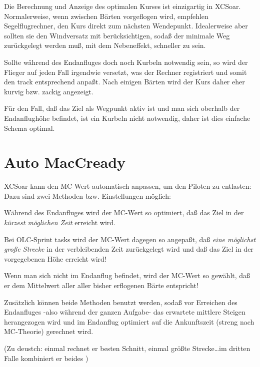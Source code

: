 Die Berechnung und Anzeige des optimalen Kurses ist einzigartig in \textsf{XCSoar}. Normalerweise,
wenn zwischen Bärten vorgeflogen wird, empfehlen Segelflugrechner, den Kurs direkt zum nächsten Wendepunkt.
Idealerweise aber sollten sie den Windversatz mit berücksichtigen, sodaß der minimale Weg zurückgelegt werden
muß, mit dem Nebeneffekt, schneller zu sein.

Sollte während des Endanfluges doch noch Kurbeln notwendig sein, so wird der Flieger auf jeden Fall
irgendwie versetzt, was der Rechner registriert und somit den track entsprechend anpaßt. Nach einigen
Bärten wird der Kurs daher eher kurvig bzw. zackig  angezeigt.

Für den Fall, daß das Ziel als Wegpunkt aktiv ist und man sich oberhalb der Endanflughöhe befindet, ist
ein Kurbeln nicht notwendig, daher ist dies einfache Schema optimal.

\section{Auto MacCready}\label{sec:auto-maccready}
\textsf{XCSoar} kann den MC-Wert automatisch anpassen, um den Piloten zu entlasten:
Dazu sind zwei Methoden bzw. Einstellungen möglich:
\begin{description}
\item[\textit{Endanflug}]  
Während des Endanfluges wird der MC-Wert so optimiert, daß das Ziel in der
\emph{kürzest möglichen Zeit} erreicht wird.

Bei OLC-Sprint tasks wird der MC-Wert dagegen so angepaßt, daß \emph{eine
möglichst große Strecke} in der verbleibenden Zeit zurückgelegt wird und daß
das Ziel in der vorgegebenen Höhe erreicht wird!
\item[\textit{Erwartetes mittleres Steigen}]
Wenn man sich nicht im Endanflug befindet, wird der MC-Wert so gewählt, daß er dem
Mittelwert aller aller bisher erflogenen Bärte entspricht!
\item[\textit{Beides}] Zusätzlich können beide Methoden benutzt werden, sodaß vor
Erreichen des Endanfluges -also während der ganzen Aufgabe- das erwartete mittlere
Steigen herangezogen wird und im Endanflug optimiert auf die
 Ankunftszeit (streng nach MC-Theorie)  gerechnet wird.
\end{description}

(Zu deustch: einmal rechnet er besten Schnitt, einmal größte Strecke\dots im
dritten Falle kombiniert er beides )

